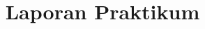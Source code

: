 \usepackage{graphicx}
\usepackage{fancyhdr}
\usepackage{titlepic}
\usepackage{pdfpages}
\usepackage[most]{tcolorbox}
\usepackage{minted}

\title{Laporan Praktikum}
